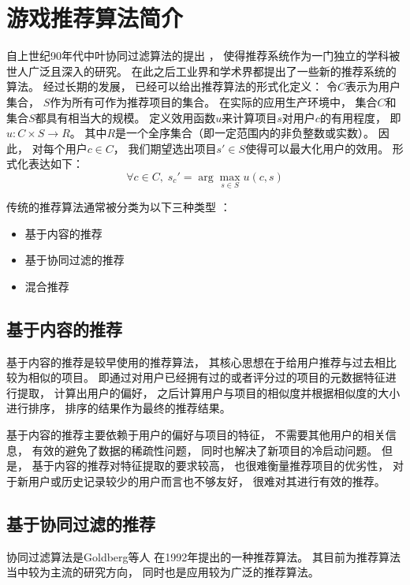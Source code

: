 \section{游戏推荐算法简介}

自上世纪90年代中叶协同过滤算法的提出
\cite{adomaviciusNextGenerationRecommender2005}，
使得推荐系统作为一门独立的学科被世人广泛且深入的研究。
在此之后工业界和学术界都提出了一些新的推荐系统的算法。
经过长期的发展，
已经可以给出推荐算法的形式化定义：
令$C$表示为用户集合，
$S$作为所有可作为推荐项目的集合。
在实际的应用生产环境中，
集合$C$和集合$S$都具有相当大的规模。
定义效用函数$u$来计算项目$s$对用户$c$的有用程度，
即$u:C\times S\rightarrow R$。
其中$R$是一个全序集合（即一定范围内的非负整数或实数）。
因此，
对每个用户$c\in C$，
我们期望选出项目$s'\in S$使得可以最大化用户的效用。
形式化表达如下：
\begin{equation}
    \forall c\in C,\; s_c'=\arg \max_{s\in S} u(c,s)
\end{equation}

传统的推荐算法通常被分类为以下三种类型
\cite{balabanovicFabContentbasedCollaborative1997}：
\begin{itemize}
    \item 基于内容的推荐
    \item 基于协同过滤的推荐
    \item 混合推荐
\end{itemize}

\subsection{基于内容的推荐}

基于内容的推荐是较早使用的推荐算法，
其核心思想在于给用户推荐与过去相比较为相似的项目。
即通过对用户已经拥有过的或者评分过的项目的元数据特征进行提取，
计算出用户的偏好，
之后计算用户与项目的相似度并根据相似度的大小进行排序，
排序的结果作为最终的推荐结果。

基于内容的推荐主要依赖于用户的偏好与项目的特征，
不需要其他用户的相关信息，
有效的避免了数据的稀疏性问题，
同时也解决了新项目的冷启动问题。
但是，
基于内容的推荐对特征提取的要求较高，
也很难衡量推荐项目的优劣性，
对于新用户或历史记录较少的用户而言也不够友好，
很难对其进行有效的推荐。

\subsection{基于协同过滤的推荐}

协同过滤算法是Goldberg等人
\cite{goldbergUsingCollaborativeFiltering1992}
在1992年提出的一种推荐算法。
其目前为推荐算法当中较为主流的研究方向，
同时也是应用较为广泛的推荐算法。

